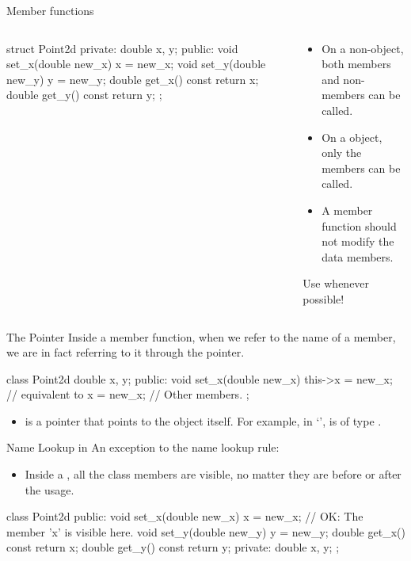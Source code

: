 \documentclass{beamer}
\begin{document}
\begin{frame}[fragile]{\const Member functions}
    \begin{columns}
        \begin{column}{0.5\linewidth}
            \begin{cpp}
struct Point2d {
 private:
  double x, y;
 public:
  void set_x(double new_x)
    { x = new_x; }
  void set_y(double new_y)
    { y = new_y; }
  double get_x() const
    { return x; }
  double get_y() const
    { return y; }
};
            \end{cpp}        
        \end{column}
        \begin{column}{0.5\linewidth}
            \begin{itemize}
                \item On a non-\const object, both \const members and non-\const members can be called.
                \item On a \const object, only the \const members can be called.
                \item A \const member function should not modify the data members.
            \end{itemize}
            Use \const whenever possible!
        \end{column}
    \end{columns}
\end{frame}

\begin{frame}[fragile]{The \this Pointer}
    Inside a member function, when we refer to the name of a member, we are in fact referring to it through the \this pointer.
    \begin{cpp}
class Point2d {
  double x, y;
 public:
  void set_x(double new_x) {
    this->x = new_x;    // equivalent to x = new_x;
  }
  // Other members.
};
    \end{cpp}
    \begin{itemize}
        \item \this is a pointer that points to the object itself. For example, in `', \this is of type .
    \end{itemize}
\end{frame}

\begin{frame}[fragile]{Name Lookup in \class}
    An exception to the name lookup rule:
    \begin{itemize}
        \item Inside a \class, all the class members are visible, no matter they are before or after the usage.
    \end{itemize}
    \begin{cpp}
class Point2d {
 public:
  void set_x(double new_x)
    { x = new_x; }      // OK: The member 'x' is visible here.
  void set_y(double new_y)
    { y = new_y; }
  double get_x() const
    { return x; }
  double get_y() const
    { return y; }
 private:
  double x, y;
};
    \end{cpp}
\end{frame}
\end{document}
